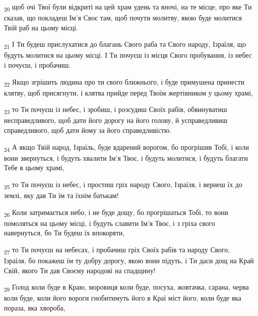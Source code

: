 \begin{tcolorbox}
\textsubscript{20} щоб очі Твої були відкриті на цей храм удень та вночі, на те місце, про яке Ти сказав, що покладеш Ім'я Своє там, щоб почути молитву, якою буде молитися Твій раб на цьому місці.
\end{tcolorbox}
\begin{tcolorbox}
\textsubscript{21} І Ти будеш прислухатися до благань Свого раба та Свого народу, Ізраїля, що будуть молитися на цьому місці. І Ти почуєш із місця Свого пробування, із небес і почуєш, і пробачиш.
\end{tcolorbox}
\begin{tcolorbox}
\textsubscript{22} Якщо згрішить людина про ти свого ближнього, і буде примушена принести клятву, щоб присягнути, і клятва прийде перед Твоїм жертівником у цьому храмі,
\end{tcolorbox}
\begin{tcolorbox}
\textsubscript{23} то Ти почуєш із небес, і зробиш, і розсудиш Своїх рабів, обвинуватиш несправедливого, щоб дати його дорогу на його голову, й усправедливиш справедливого, щоб дати йому за його справедливістю.
\end{tcolorbox}
\begin{tcolorbox}
\textsubscript{24} А якщо Твій народ, Ізраїль, буде вдарений ворогом, бо прогрішив Тобі, і коли вони звернуться, і будуть хвалити Ім'я Твоє, і будуть молитися, і будуть благати Тебе в цьому храмі,
\end{tcolorbox}
\begin{tcolorbox}
\textsubscript{25} то Ти почуєш із небес, і простиш гріх народу Свого, Ізраїля, і вернеш їх до землі, яку дав Ти їм та їхнім батькам!
\end{tcolorbox}
\begin{tcolorbox}
\textsubscript{26} Коли затримається небо, і не буде дощу, бо прогрішаться Тобі, то вони помоляться на цьому місці, і будуть славити Ім'я Твоє, і з гріха свого навернуться, бо Ти будеш їх впокоряти,
\end{tcolorbox}
\begin{tcolorbox}
\textsubscript{27} то Ти почуєш на небесах, і пробачиш гріх Своїх рабів та народу Свого, Ізраїля, бо покажеш їм ту добру дорогу, якою вони підуть, і Ти даси дощ на Край Свій, якого Ти дав Своєму народові на спадщину!
\end{tcolorbox}
\begin{tcolorbox}
\textsubscript{28} Голод коли буде в Краю, моровиця коли буде, посуха, жовтачка, сарана, черва коли буде, коли його вороги гнобитимуть його в Краї міст його, коли буде яка пораза, яка хвороба,
\end{tcolorbox}
